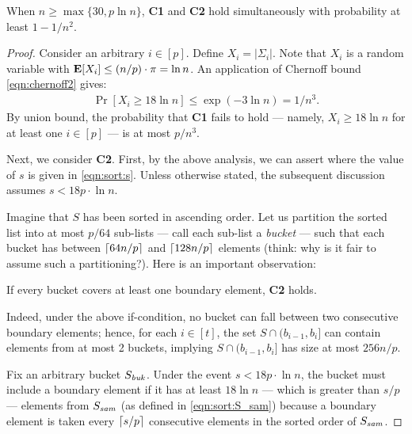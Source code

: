 \begin{theorem} \label{thm:sort}
	When $n \ge \max\{30, p \ln n\}$, {\bf C1} and {\bf C2} hold simultaneously with probability at least $1 - 1/n^2$.
\end{theorem}

\begin{proof}
	Consider an arbitrary $i \in [p]$. Define $X_i = |\Sigma_i|$. Note that $X_i$ is a random variable with $\expt[X_i] \le (n/p) \cdot \pi = \ln n$. An application of Chernoff bound \eqref{eqn:chernoff2} gives:
	\begin{eqnarray}
		\Pr[X_i \ge 18 \ln n] \le \exp(- 3 \ln n) = 1/n^3. \nonumber
	\end{eqnarray}
	By union bound, the probability that {\bf C1} fails to hold --- namely,
	$X_i \ge 18 \ln n$ for at least one $i \in [p]$ --- is at most $p/n^3$.

	\vgap

	Next, we consider {\bf C2}. First, by the above analysis, we can assert
	where the value of $s$ is given in \eqref{eqn:sort:s}.
	Unless otherwise stated, the subsequent discussion assumes $s < 18 p \cdot \ln n$.

	\vgap

	Imagine that $S$ has been sorted in ascending order. Let us partition the sorted list into at most $p/64$ sub-lists --- call each sub-list a {\em bucket} --- such that each bucket has between $\lc 64 n/p \rc$ and $\lc 128 n/p \rc$ elements (think: why is it fair to assume such a partitioning?). Here is an important observation:

	\begin{center}
        If every bucket covers at least one boundary element, {\bf C2} holds.
	\end{center}

	\noindent Indeed, under the above if-condition, no bucket can fall between two consecutive boundary elements; hence, for each $i \in [t]$, the set $S \cap (b_{i-1}, b_i]$ can contain elements from at most 2 buckets, implying $S \cap (b_{i-1}, b_i]$ has size at most $256 n/p$.

	\vgap

	Fix an arbitrary bucket $S_\mit{buk}$. Under the event $s < 18p \cdot \ln n$, the bucket must include a boundary element if it has at least $18 \ln n$ --- which is greater than $s/p$ --- elements from $S_\mit{sam}$ (as defined in \eqref{eqn:sort:S_sam}) because a boundary element is taken every $\lc s/p \rc$ consecutive elements in the sorted order of $S_\mit{sam}$.


\end{proof}
